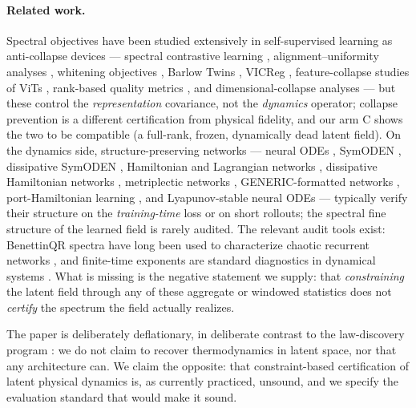 \documentclass[11pt]{article}
\begin{document}
\paragraph{Related work.}
Spectral objectives have been studied extensively in self-supervised
learning as anti-collapse devices --- spectral contrastive learning
\cite{haochen2021spectral}, alignment--uniformity analyses
\cite{wang2020understanding}, whitening objectives
\cite{ermolov2021whitening}, Barlow Twins \cite{zbontar2021barlow}, VICReg
\cite{bardes2022vicreg}, feature-collapse studies of ViTs
\cite{caron2021emerging}, rank-based quality metrics
\cite{garrido2023rankme}, and dimensional-collapse analyses
\cite{jing2022dimensional} --- but these control the \emph{representation}
covariance, not the \emph{dynamics} operator; collapse prevention is a
different certification from physical fidelity, and our arm C shows the
two to be compatible (a full-rank, frozen, dynamically dead latent
field). On the dynamics side, structure-preserving networks --- neural
ODEs \cite{chen2018neural}, SymODEN \cite{zhong2020symoden}, dissipative
SymODEN \cite{zhong2021dissipative}, Hamiltonian and Lagrangian networks
\cite{greydanus2019hamiltonian,cranmer2020lagrangian,toth2020hamiltonian,lutter2019deep},
dissipative Hamiltonian networks \cite{sosanya2022dissipative},
metriplectic networks
\cite{hernandez2021metriplectic}, GENERIC-formatted networks
\cite{zhang2021generic}, port-Hamiltonian learning
\cite{van2020port}, and Lyapunov-stable neural ODEs
\cite{kolter2019lyapunov} --- typically verify their structure on the
\emph{training-time} loss or on short rollouts; the spectral fine
structure of the learned field is rarely audited. The relevant audit
tools exist: Benettin\textendash{}QR spectra have long been used to
characterize chaotic recurrent networks \cite{engelken2020lyapunov,vogt2022lyapunov},
and finite-time exponents are standard diagnostics in dynamical systems
\cite{haller2001distinguished}. What is missing is the negative
statement we supply: that \emph{constraining} the latent field through
any of these aggregate or windowed statistics does not \emph{certify}
the spectrum the field actually realizes.

The paper is deliberately deflationary, in deliberate contrast to the
law-discovery program \cite{brunton2016discovering,iten2020ai,karniadakis2021physics}:
we do not claim to recover thermodynamics in latent space, nor that any
architecture can. We claim the opposite: that constraint-based
certification of latent physical dynamics is, as currently practiced,
unsound, and we specify the evaluation standard that would make it sound.
\end{document}
